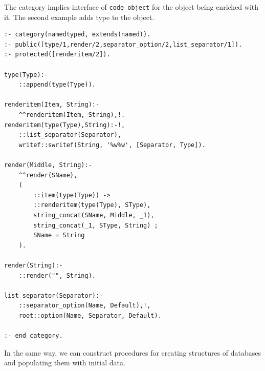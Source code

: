 \documentclass[12pt,a4paper]{llncs}
\begin{document}
The category implies interface of \texttt{code\_object} for the object being enriched with it.  The second example adds type to the object.

\begin{verbatim}
:- category(namedtyped, extends(named)).
:- public([type/1,render/2,separator_option/2,list_separator/1]).
:- protected([renderitem/2]).

type(Type):-
    ::append(type(Type)).

renderitem(Item, String):-
    ^^renderitem(Item, String),!.
renderitem(type(Type),String):-!,
    ::list_separator(Separator),
    writef::swritef(String, '%w%w', [Separator, Type]).

render(Middle, String):-
    ^^render(SName),
    (
        ::item(type(Type)) ->
        ::renderitem(type(Type), SType),
        string_concat(SName, Middle, _1),
        string_concat(_1, SType, String) ;
        SName = String
    ).

render(String):-
    ::render("", String).

list_separator(Separator):-
    ::separator_option(Name, Default),!,
    root::option(Name, Separator, Default).

:- end_category.
\end{verbatim}

In the same way, we can construct procedures for creating structures of databases and populating them with initial data.


\end{document}
